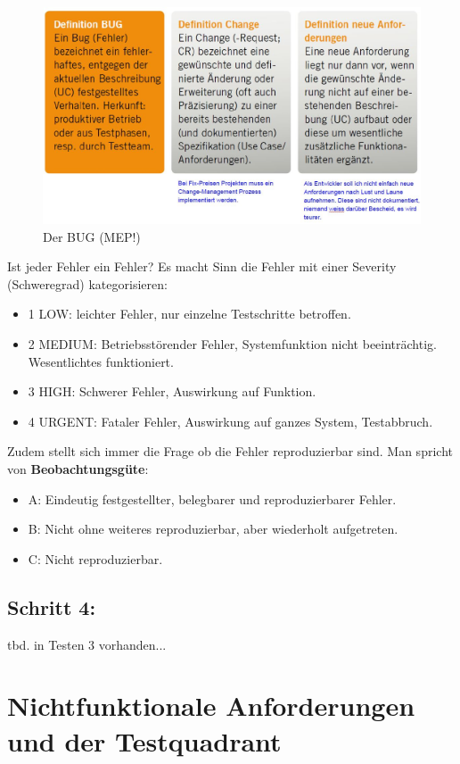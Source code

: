 \begin{figure}[h!]
\centering
\includegraphics[width=0.7\linewidth]{fig/der-bug}
\caption{Der BUG (MEP!)}
\label{fig:der-bug}
\end{figure}

Ist jeder Fehler ein Fehler? Es macht Sinn die Fehler mit einer Severity (Schweregrad) kategorisieren:
\begin{itemize}
	\item 1 LOW: leichter Fehler, nur einzelne Testschritte betroffen.
	\item 2 MEDIUM: Betriebsstörender Fehler, Systemfunktion nicht beeinträchtig. Wesentlichtes funktioniert.
	\item 3 HIGH: Schwerer Fehler, Auswirkung auf Funktion.
	\item 4 URGENT: Fataler Fehler, Auswirkung auf ganzes System, Testabbruch.
\end{itemize}

Zudem stellt sich immer die Frage ob die Fehler reproduzierbar sind. Man spricht von \textbf{Beobachtungsgüte}:
\begin{itemize}
	\item A: Eindeutig festgestellter, belegbarer und reproduzierbarer Fehler.
	\item B: Nicht ohne weiteres reproduzierbar, aber wiederholt aufgetreten.
	\item C: Nicht reproduzierbar.	
\end{itemize}

\subsection{Schritt 4: }
tbd. in Testen 3 vorhanden...

\newpage
\section{Nichtfunktionale Anforderungen und der Testquadrant}

